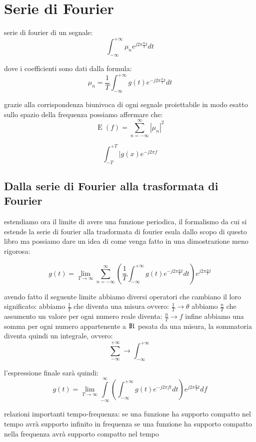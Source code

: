 \documentclass{article}
\begin{document}
\section{Serie di Fourier}

serie di fourier di un segnale:
$$\int_{-\infty}^{+\infty} \mu_n e^{j 2\pi \frac{n}{T}t}dt$$

dove i coefficienti sono dati dalla formula:
$$\mu_n = \frac{1}{T} \int_{-\infty}^{+\infty} g(t) e^{-j 2\pi \frac{n}{T} t}dt$$

grazie alla corrispondenza biunivoca di ogni segnale proiettabile in modo esatto sullo spazio della frequenza possiamo affermare che:
$$ \operatorname{E}(f) =  \sum\limits_{n=-\infty}^{\infty} |\mu_n|^2$$



$$\int_{-T}^{+T} |g(x) e^{-j2\pi f}$$

\subsection{Dalla serie di Fourier alla trasformata di Fourier}
estendiamo ora il limite di avere una funzione periodica, il formalismo da cui
si estende la serie di fourier alla trasformata di fourier esula dallo scopo di questo libro
ma possiamo dare un idea di come venga fatto in una dimostrazione meno rigorosa:

$$g(t) = \lim_{T \to \infty} \sum\limits_{n=-\infty}^{\infty} (\frac{1}{T} \int_{-\infty}^{+\infty} g(t) e^{-j 2\pi \frac{n}{T} t}dt )e^{j 2\pi \frac{n}{T} t}$$

avendo fatto il seguente limite abbiamo diversi operatori che cambiano il loro significato:
\n
abbiamo $\frac{1}{T}$ che diventa una misura ovvero:
$\frac{1}{T} \to \theta$
abbiamo $\frac{n}{T}$ che assumento un valore per ogni numero reale diventa:
$\frac{n}{T} \to f$
infine abbiamo una somma per ogni numero appartenente a $\rm I\!R$ pesata da una misura,
la sommatoria diventa quindi un integrale, ovvero:
$$\sum_{-\infty}^{+\infty} \to \int_{-\infty}^{+\infty}$$

l'espressione finale sarà quindi:
$$g(t) = \lim_{T \to \infty} \int\limits_{-\infty}^{\infty} (\int_{-\infty}^{+\infty} g(t) e^{-j 2\pi ft}dt )e^{j 2\pi \frac{n}{T} t}df $$

relazioni importanti tempo-frequenza:
se una funzione ha supporto compatto nel tempo avrà supporto infinito in frequenza
se una funzione ha supporto compatto nella frequenza avrà supporto compatto nel tempo


\end{document}
